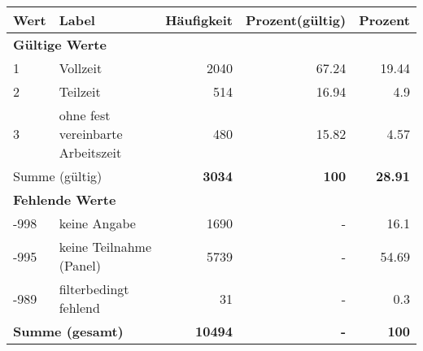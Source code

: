      \begin{longtable}{lXrrr}
     \toprule
     \textbf{Wert} & \textbf{Label} & \textbf{Häufigkeit} & \textbf{Prozent(gültig)} & \textbf{Prozent} \\
     \endhead
     \midrule
     \multicolumn{5}{l}{\textbf{Gültige Werte}}\\

     1 &
     \multicolumn{1}{X}{ Vollzeit   } &


       \num{2040} &
       \num[round-mode=places,round-precision=2]{67.24} &
         \num[round-mode=places,round-precision=2]{19.44} \\

     2 &
     \multicolumn{1}{X}{ Teilzeit   } &


       \num{514} &
       \num[round-mode=places,round-precision=2]{16.94} &
         \num[round-mode=places,round-precision=2]{4.9} \\

     3 &
     \multicolumn{1}{X}{ ohne fest vereinbarte Arbeitszeit   } &


       \num{480} &
       \num[round-mode=places,round-precision=2]{15.82} &
         \num[round-mode=places,round-precision=2]{4.57} \\
     \midrule
     \multicolumn{2}{l}{Summe (gültig)} &
       \textbf{\num{3034}} &
     \textbf{\num{100}} &
       \textbf{\num[round-mode=places,round-precision=2]{28.91}} \\
     \multicolumn{5}{l}{\textbf{Fehlende Werte}}\\
       -998 &
       keine Angabe &
         \num{1690} &
        - &
         \num[round-mode=places,round-precision=2]{16.1} \\
       -995 &
       keine Teilnahme (Panel) &
         \num{5739} &
        - &
         \num[round-mode=places,round-precision=2]{54.69} \\
       -989 &
       filterbedingt fehlend &
         \num{31} &
        - &
         \num[round-mode=places,round-precision=2]{0.3} \\
     \midrule
     \multicolumn{2}{l}{\textbf{Summe (gesamt)}} &
          \textbf{\num{10494}} &
        \textbf{-} &
        \textbf{\num{100}} \\
     \bottomrule
     \end{longtable}
     

